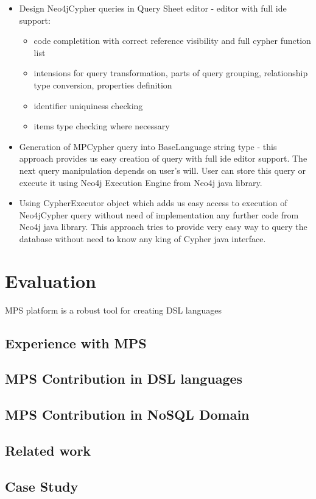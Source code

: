 \begin{itemize}
  \item Design Neo4jCypher queries in Query Sheet editor - editor with full ide support:
  	\begin{itemize}
  	  \item code completition with correct reference visibility and full cypher function list
  	  \item intensions for query transformation, parts of query grouping, relationship
  	  type conversion, properties definition
  	  \item identifier uniquiness checking
  	  \item items type checking where necessary
  	\end{itemize} 
  \item Generation of MPCypher query into BaseLanguage string type - this approach provides us
  easy creation of query with full ide editor support. The next query manipulation depends on user's
  will. User can store this query or execute it using Neo4j Execution Engine from Neo4j java
  library.
  \item Using CypherExecutor object which adds us easy access to execution of Neo4jCypher query
  without need of implementation any further code from Neo4j java library. This approach tries to
  provide very easy way to query the database without need to know any king of Cypher java
  interface.
\end{itemize}



\chapter{Evaluation}

MPS platform is a robust tool for creating DSL languages


\section{Experience with MPS}

\section{MPS Contribution in DSL languages}


\section{MPS Contribution in NoSQL Domain}

\section{Related work}
		
\section{Case Study}








